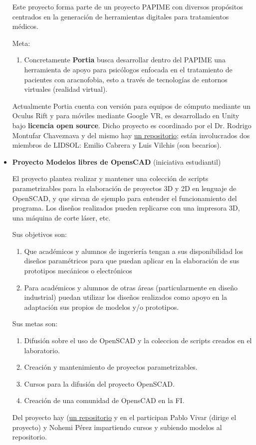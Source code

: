 \documentclass[a4paper,11pt]{article}                 %
\begin{document}
\begin{itemize}
      Este proyecto forma parte de un proyecto PAPIME con diversos propósitos centrados en la generación de herramientas digitales para tratamientos médicos.
      
      Meta:
      \begin{enumerate}
        \item Concretamente \textbf{Portia} busca desarrollar dentro del PAPIME una herramienta de apoyo para psicólogos enfocada en el tratamiento de pacientes con aracnofobia, esto a través de tecnologías de entornos virtuales (realidad virtual).
      \end{enumerate}
      
Actualmente Portia cuenta con versión para equipos de cómputo mediante un Oculus Rift y para móviles mediante Google VR, es desarrollado en Unity bajo \textbf{licencia open source}.
       Dicho proyecto es coordinado por el Dr. Rodrigo Montufar Chaveznava y del mismo hay \href{https://github.com/LIDSOL/portia}{un repositorio}; están involucrados dos miembros de LIDSOL: Emilio Cabrera y Luis Vilchis (son becarios).
       
       \item \textbf{Proyecto Modelos libres de OpensCAD} (iniciativa estudiantil)
       
       El proyecto plantea realizar y mantener una colección de scripts parametrizables para la elaboración de proyectos 3D y 2D en lenguaje de OpenSCAD, y que sirvan de ejemplo para entender el funcionamiento del programa. Los diseños realizados pueden replicarse con una impresora 3D, una máquina de corte láser, etc.
       
       Sus objetivos son:
       \begin{enumerate}
    \item Que académicos y alumnos de ingeriería tengan a sus disponibilidad los diseños paramétricos para que puedan aplicar en la elaboración de sus prototipos mecánicos o electrónicos 
    \item Para académicos y alumnos de otras áreas (particularmente en diseño industrial) puedan utilizar los diseños realizados como apoyo en  la adaptación sus propios de modelos y/o prototipos.
\end{enumerate}

Sus metas son:
\begin{enumerate}
    \item Difusión sobre el uso de OpenSCAD y la coleccion de scripts creados en el laboratorio.
    \item Creación y mantenimiento de proyectos parametrizables.
    \item Cursos para la difusión del proyecto OpenSCAD.
    \item Creación de una comunidad de OpensCAD en la FI.
    
\end{enumerate}
       
       Del proyecto hay (\href{https://github.com/LIDSOL/OpenSCAD-free-models}{un repositorio} y en el participan Pablo Vivar (dirige el proyecto) y Nohemi Pérez impartiendo cursos y subiendo modelos al repositorio.
  \end{itemize}
  
\end{document}

